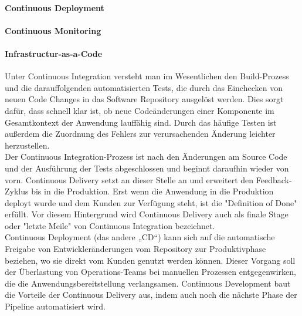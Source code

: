 \paragraph{Continuous Deployment}

\paragraph{Continuous Monitoring}

\paragraph{Infrastructur-as-a-Code}













Unter Continuous Integration versteht man im Wesentlichen den Build-Prozess und die darauffolgenden automatisierten Tests, die durch das Einchecken von neuen Code Changes in das Software Repository ausgelöst werden. Dies sorgt dafür, dass schnell klar ist, ob neue Codeänderungen einer Komponente im Gesamtkontext der Anwendung lauffähig sind. Durch das häufige Testen ist außerdem die Zuordnung des Fehlers zur verursachenden Änderung leichter herzustellen.\\

Der Continuous Integration-Prozess ist nach den Änderungen am Source Code und der Ausführung der Tests abgeschlossen und beginnt daraufhin wieder von vorn. Continuous Delivery setzt an dieser Stelle an und erweitert den Feedback-Zyklus bis in die Produktion. Erst wenn die Anwendung in die Produktion deployt wurde und dem Kunden zur Verfügung steht, ist die "Definition of Done" erfüllt. Vor diesem Hintergrund wird Continuous Delivery auch als finale Stage oder "letzte Meile" von Continuous Integration bezeichnet.\\

Continuous Deployment (das andere „CD“) kann sich auf die automatische Freigabe von Entwickleränderungen vom Repository zur Produktivphase beziehen, wo sie direkt vom Kunden genutzt werden können. Dieser Vorgang soll der Überlastung von Operations-Teams bei manuellen Prozessen entgegenwirken, die die Anwendungsbereitstellung verlangsamen. Continuous Development baut die Vorteile der Continuous Delivery aus, indem auch noch die nächste Phase der Pipeline automatisiert wird.\\

